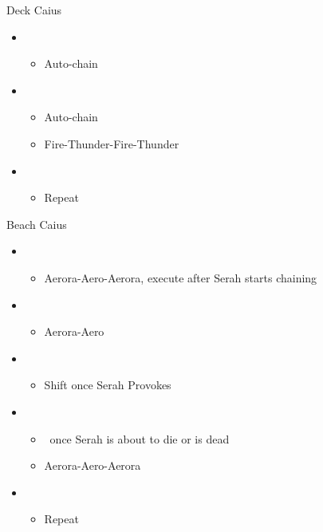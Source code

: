 \begin{battle}{Deck Caius}
  \begin{flushleft}
    \begin{itemize}
      \item \sixth
            \begin{itemize}
              \item Auto-chain
            \end{itemize}
      \item \fifth
            \begin{itemize}
              \item Auto-chain
              \item Fire-Thunder-Fire-Thunder
            \end{itemize}
      \item \sixth
            \begin{itemize}
              \item Repeat
            \end{itemize}
    \end{itemize}
  \end{flushleft}
\end{battle}

\begin{battle}{Beach Caius}
  \begin{flushleft}
    \begin{itemize}
      \item \sixth
            \begin{itemize}
              \item Aerora-Aero-Aerora, execute after Serah starts chaining
            \end{itemize}
      \item \fifth
            \begin{itemize}
              \item Aerora-Aero
            \end{itemize}
      \item \fourth
            \begin{itemize}
              \item Shift once Serah Provokes
            \end{itemize}
      \item \fifth
            \begin{itemize}
              \item \stagger\ once Serah is about to die or is dead
              \item Aerora-Aero-Aerora
            \end{itemize}
      \item \sixth
            \begin{itemize}
              \item Repeat
            \end{itemize}
    \end{itemize}
  \end{flushleft}
\end{battle}


